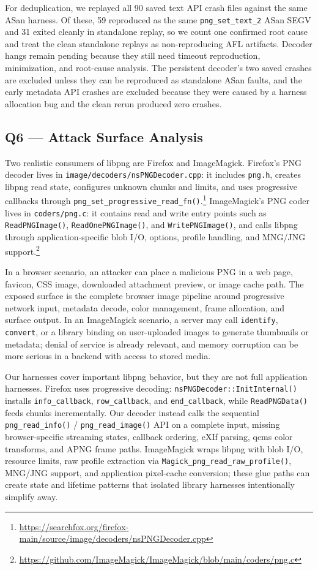 \documentclass[letterpaper,twocolumn,10pt]{article}
\begin{document}
For deduplication, we replayed all 90 saved text API crash files against the
same ASan harness. Of these, 59 reproduced as the same
\texttt{png\_set\_text\_2} ASan SEGV and 31 exited cleanly in standalone
replay, so we count one confirmed root cause and treat the clean standalone
replays as non-reproducing AFL artifacts. Decoder hangs remain pending because
they still need timeout reproduction, minimization, and root-cause analysis.
The persistent decoder's two saved crashes are excluded unless they can be
reproduced as standalone ASan faults, and the early metadata API crashes are
excluded because they were caused by a harness allocation bug and the clean
rerun produced zero crashes.

\subsection{Q6 --- Attack Surface Analysis}
Two realistic consumers of libpng are Firefox and ImageMagick. Firefox's PNG
decoder lives in \texttt{image/decoders/nsPNGDecoder.cpp}: it includes
\texttt{png.h}, creates libpng read state, configures unknown chunks and
limits, and uses progressive callbacks through
\texttt{png\_set\_progressive\_read\_fn()}.\footnote{\url{https://searchfox.org/firefox-main/source/image/decoders/nsPNGDecoder.cpp}}
ImageMagick's PNG coder lives in \texttt{coders/png.c}: it contains read and
write entry points such as \texttt{ReadPNGImage()}, \texttt{ReadOnePNGImage()},
and \texttt{WritePNGImage()}, and calls libpng through application-specific
blob I/O, options, profile handling, and MNG/JNG support.\footnote{\url{https://github.com/ImageMagick/ImageMagick/blob/main/coders/png.c}}

In a browser scenario, an attacker can place a malicious PNG in a web page,
favicon, CSS image, downloaded attachment preview, or image cache path. The
exposed surface is the complete browser image pipeline around progressive
network input, metadata decode, color management, frame allocation, and surface
output. In an ImageMagick scenario, a server may call \texttt{identify},
\texttt{convert}, or a library binding on user-uploaded images to generate
thumbnails or metadata; denial of service is already relevant, and memory
corruption can be more serious in a backend with access to stored media.

Our harnesses cover important libpng behavior, but they are not full
application harnesses. Firefox uses progressive decoding:
\texttt{nsPNGDecoder::InitInternal()} installs \texttt{info\_callback},
\texttt{row\_callback}, and \texttt{end\_callback}, while
\texttt{ReadPNGData()} feeds chunks incrementally. Our decoder instead calls
the sequential \texttt{png\_read\_info()} / \texttt{png\_read\_image()} API on a
complete input, missing browser-specific streaming states, callback ordering,
eXIf parsing, qcms color transforms, and APNG frame paths. ImageMagick wraps
libpng with blob I/O, resource limits, raw profile extraction via
\texttt{Magick\_png\_read\_raw\_profile()}, MNG/JNG support, and application
pixel-cache conversion; these glue paths can create state and lifetime patterns
that isolated library harnesses intentionally simplify away.
\end{document}
